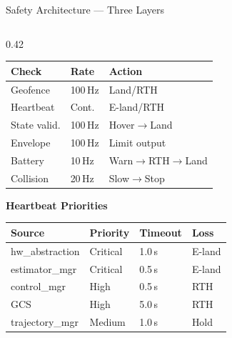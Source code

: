 \documentclass[aspectratio=169, 10pt]{beamer}
\begin{document}
\begin{frame}{Safety Architecture --- Three Layers}
\begin{columns}[T]
\begin{column}{0.42\textwidth}
\vspace{0.2em}
\tiny
\begin{tabular}{@{}lll@{}}
\toprule
\textbf{Check} & \textbf{Rate} & \textbf{Action} \\
\midrule
Geofence & 100\,Hz & Land/RTH \\
Heartbeat & Cont. & E-land/RTH \\
State valid. & 100\,Hz & Hover$\to$Land \\
Envelope & 100\,Hz & Limit output \\
Battery & 10\,Hz & Warn$\to$RTH$\to$Land \\
Collision & 20\,Hz & Slow$\to$Stop \\
\bottomrule
\end{tabular}

\vspace{0.3em}
\normalsize
\textbf{Heartbeat Priorities}

\vspace{0.2em}
\tiny
\begin{tabular}{@{}llll@{}}
\toprule
\textbf{Source} & \textbf{Priority} & \textbf{Timeout} & \textbf{Loss} \\
\midrule
hw\_abstraction & Critical & 1.0\,s & E-land \\
estimator\_mgr & Critical & 0.5\,s & E-land \\
control\_mgr & High & 0.5\,s & RTH \\
GCS & High & 5.0\,s & RTH \\
trajectory\_mgr & Medium & 1.0\,s & Hold \\
\bottomrule
\end{tabular}
\end{column}
\end{columns}
\end{frame}
\end{document}
